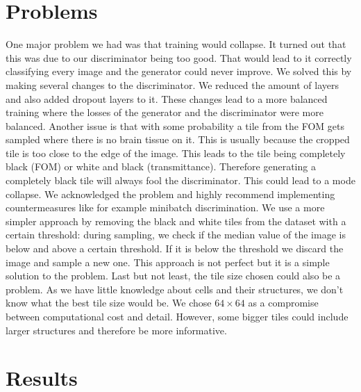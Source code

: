 \documentclass[12pt]{article}
\begin{document}
\section{Problems}
One major problem we had was that training would collapse. It turned out that this was due to our discriminator being too good. That would lead to it correctly classifying every image and the generator could never improve. We solved this by making several changes to the discriminator. We reduced the amount of layers and also added dropout layers to it. These changes lead to a more balanced training where the losses of the generator and the discriminator were more balanced.
Another issue is that with some probability a tile from the FOM gets sampled where there is no brain tissue on it. This is usually because the cropped tile is too close to the edge of the image. This leads to the tile being completely black (FOM) or white and black (transmittance). Therefore generating a completely black tile will always fool the discriminator. This could lead to a mode collapse. We acknowledged the problem and highly recommend implementing countermeasures like for example minibatch discrimination. We use a more simpler approach by removing the black and white tiles from the dataset with a certain threshold: during sampling, we check if the median value of the image is below and above a certain threshold. If it is below the threshold we discard the image and sample a new one. This approach is not perfect but it is a simple solution to the problem.
Last but not least, the tile size chosen could also be a problem. As we have little knowledge about cells and their structures, we don't know what the best tile size would be. We chose $64 \times 64$ as a compromise between computational cost and detail. However, some bigger tiles could include larger structures and therefore be more informative.
\section{Results}
\end{document}
